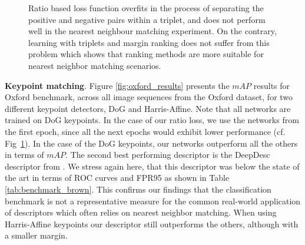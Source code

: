 \begin{figure}
\centering    
{}
\caption{Ratio based loss function overfits in the process of
   separating the positive and negative pairs within a
  triplet, and does not perform well in the nearest neighbour
  matching experiment. On the contrary, learning with triplets and
  margin ranking does not suffer from this problem which shows
  that ranking methods are more suitable for nearest neighbor
  matching scenarios.}
\label{fig:losses-vs}
\vspace{-0.1cm}
\end{figure}

\textbf{Keypoint matching}. Figure \ref{fig:oxford_results} presents the $mAP$ results for Oxford benchmark,
across all image sequences from the Oxford dataset, for two
different  keypoint detectors, DoG and Harris-Affine. Note that all
networks are trained on DoG keypoints. In the case of our ratio loss, we use the networks from the first epoch, since all the next
epochs would exhibit lower performance (cf. Fig~\ref{fig:losses-vs}).
In the case of the DoG keypoints, our networks outperform
all the others in terms of $mAP$. The second best performing
descriptor is the DeepDesc descriptor from \cite{simo2015deepdesc}. We
stress again here, that this descriptor was below the state of
the art in terms of ROC curves and FPR95 as shown in Table
\ref{tab:benchmark_brown}. This confirms our findings that the
classification benchmark is not a representative measure for the  common
real-world application of descriptors which often relies on nearest neighbor matching. When using
Harris-Affine keypoints our descriptor still outperforms the others,
although with a smaller margin.


